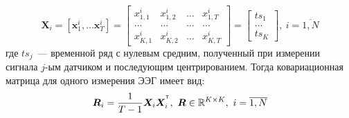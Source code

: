\documentclass[a4paper, 12pt]{extarticle}
\begin{document}
\begin{equation*}
	\bm{X}_i= \left[\bm{x}^i_1,\dots \bm{x}^i_{T}\right] = 
	\begin{bmatrix}
	x^i_{1,1} & x^i_{1,2} &  \dots  &  x^i_{1,T}\\
	\dots & \dots &  \dots  &  \dots\\
	x^i_{K,1} & x^i_{K,2} &  \dots  &  x^i_{K,T}
	\end{bmatrix}
	= \begin{bmatrix}
		ts_1\\
		\dots\\
		ts_K
		\end{bmatrix},~i = \overline{1, N}
	\end{equation*}
где $ts_j$~--- временной ряд с нулевым средним, полученный при измерении сигнала $j$-ым датчиком и последующим центрированием.
Тогда ковариационная матрица для одного измерения ЭЭГ имеет вид:
$$ \bm{R}_i = \dfrac{1}{T-1}\bm{X}_i\bm{X}_i^{^{\mathsf{T}}}, ~\bm{R} \in \mathbb{R}^{K\times K},~i = \overline{1, N}$$
\end{document}

